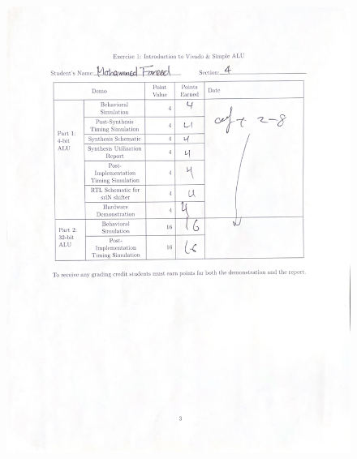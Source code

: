 \documentclass[CMPE]{KGCOEReport}
\begin{document}
\newpage
\begin{figure}[H]
    \centering
    \begin{adjustbox}{center}
        \includegraphics[width=1.35\textwidth]{signoff.pdf}
    \end{adjustbox}
\end{figure}
\end{document}
